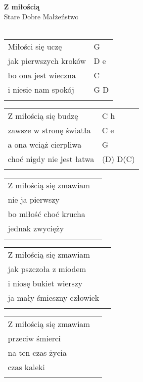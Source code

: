 \documentclass[a5paper]{article}
\begin{document}


\noindent
\fontsize{12pt}{15pt}\selectfont
\textbf{Z miłością} \\
\fontsize{8pt}{10pt}\selectfont
Stare Dobre Małżeństwo \\ \\
\fontsize{10pt}{12pt}\selectfont
{}
\begin{tabular}{@{}p{6.50cm}p{3cm}@{}}
\noindent
Miłości się uczę & G \\
jak pierwszych kroków & D e \\ 
bo ona jest wieczna & C \\
i niesie nam spokój & G D \\ \\
\end{tabular}

\noindent
\begin{tabular}{@{}p{5.50cm}p{3cm}@{}}
Z miłością się budzę & C h \\
zawsze w stronę światła & C e \\
a ona wciąż cierpliwa & G \\
choć nigdy nie jest łatwa & (D) D(C) \\ \\
\end{tabular}

\noindent
{}
\begin{tabular}{@{}p{7.50cm}p{3cm}@{}}
\noindent
Z miłością się zmawiam \\
nie ja pierwszy \\
bo miłość choć krucha \\
jednak zwycięży \\ \\
\end{tabular}

\noindent
{}
\noindent
\begin{tabular}{@{}p{6.50cm}p{3cm}@{}}
Z miłością się zmawiam\\
jak pszczoła z miodem\\
i niosę bukiet wierszy\\
ja mały śmieszny człowiek\\ \\
\end{tabular}

\noindent
{}
\begin{tabular}{@{}p{7.50cm}p{3cm}@{}}
\noindent
Z miłością się zmawiam\\
przeciw śmierci\\
na ten czas życia\\
czas kaleki\\\\
\end{tabular}
\end{document}
